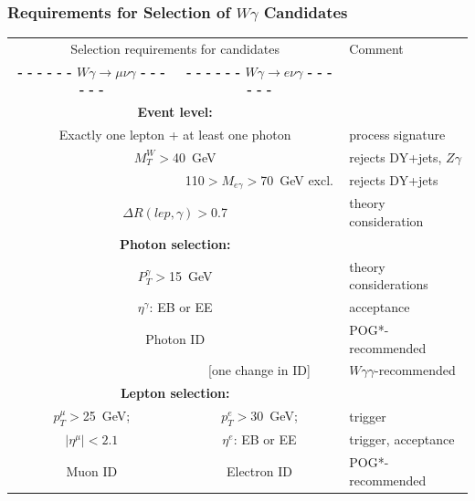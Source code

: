 \begin{frame}\frametitle{Requirements for Selection of $W\gamma$ Candidates}
  \begin{table}[h]
     \tiny
     \begin{center}
     \begin{tabular}{|c|c|l|}
     \hline
     \multicolumn{2}{|c|}{\scriptsize{Selection requirements for candidates}} & {\scriptsize{Comment}} \\ 
     {\bfseries{- - - - - - $W\gamma\rightarrow\mu\nu\gamma$ - - - - - -}} & 
     {\bfseries{- - - - - - $W\gamma\rightarrow e\nu\gamma$ - - - - - -}}  & \\ \hline

    \multicolumn{2}{|c|}{\scriptsize\bfseries{Event level:}}  & \\ 
     \multicolumn{2}{|c|}{Exactly one lepton + at least one photon}  & process signature\\  
      \multicolumn{2}{|c|}{$M_T^W>$40~GeV} & rejects DY+jets, $Z\gamma$\\ 
                                & 110$>M_{e\gamma}>$70~GeV excl. & rejects DY+jets\\ 
      \multicolumn{2}{|c|}{$\Delta{R}(lep,\gamma)>$0.7} & theory consideration\\  \hline

     \multicolumn{2}{|c|}{\scriptsize\bfseries{Photon selection:}} & \\
     \multicolumn{2}{|c|}{\tiny{$P_T^{\gamma}>$15~GeV}} & theory considerations \\ 
     \multicolumn{2}{|c|}{\tiny{$\eta^{\gamma}$: EB or EE}} & acceptance \\ 
     \multicolumn{2}{|c|}{\tiny{Photon ID}} & POG*-recommended \\ 
             &{\tiny{ [one change in ID]}} & $W\gamma\gamma$-recommended\\ \hline

     \multicolumn{2}{|c|}{\scriptsize\bfseries{Lepton selection:}} & \\
      \tiny{$p_T^{\mu}>$25~GeV;} &  \tiny{$p_T^{e}>$30~GeV;}  & trigger\\ 
      \tiny{$|\eta^{\mu}|<2.1$} & \tiny{  $\eta^{e}$: EB or EE} & trigger, acceptance\\ 
      Muon ID & Electron ID & POG*-recommended \\ \hline


\end{tabular}
\end{center}
\end{table}
\end{frame}
